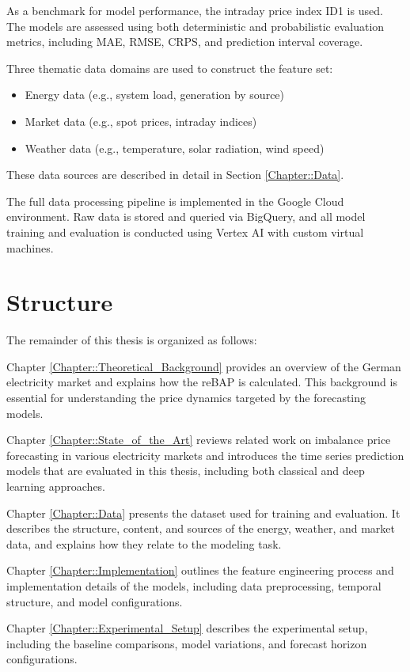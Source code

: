 \documentclass[class=scrbook, crop=false]{standalone}
\begin{document}
As a benchmark for model performance, the intraday price index ID1 is used. 
The models are assessed using both deterministic and probabilistic evaluation metrics, including \gls{MAE}, \gls{RMSE}, \gls{CRPS}, and prediction interval coverage.

Three thematic data domains are used to construct the feature set:
\begin{itemize}
\item Energy data (e.g., system load, generation by source)
\item Market data (e.g., spot prices, intraday indices)
\item Weather data (e.g., temperature, solar radiation, wind speed)
\end{itemize}
These data sources are described in detail in Section \ref{Chapter::Data}.

The full data processing pipeline is implemented in the Google Cloud environment. Raw data is stored and queried via BigQuery, and all model training and evaluation is conducted using Vertex AI with custom virtual machines.

\section{Structure}
\label{Section::Structure}
The remainder of this thesis is organized as follows:

Chapter \ref{Chapter::Theoretical_Background} provides an overview of the German electricity market and explains how the \gls{reBAP} is calculated. This background is essential for understanding the price dynamics targeted by the forecasting models.

Chapter \ref{Chapter::State_of_the_Art} reviews related work on imbalance price forecasting in various electricity markets and introduces the time series prediction models that are evaluated in this thesis, including both classical and deep learning approaches.

Chapter  \ref{Chapter::Data} presents the dataset used for training and evaluation. It describes the structure, content, and sources of the energy, weather, and market data, and explains how they relate to the modeling task.

Chapter  \ref{Chapter::Implementation} outlines the feature engineering process and implementation details of the models, including data preprocessing, temporal structure, and model configurations.

Chapter \ref{Chapter::Experimental_Setup}  describes the experimental setup, including the baseline comparisons, model variations, and forecast horizon configurations.
\end{document}
